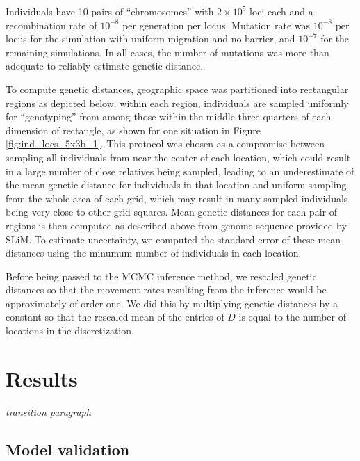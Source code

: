 \documentclass{article}
\newcommand{\plr}[1]{{\em \color{blue} #1}}
\begin{document}
Individuals have 10 pairs of ``chromosomes'' with $2 \times 10^5$ loci each 
and a recombination rate of $10^{-8}$ per generation per locus.
Mutation rate was $10^{-8}$ per locus for the simulation with uniform migration and no barrier,
and $10^{-7}$ for the remaining simulations.
In all cases, the number of mutations was more than adequate to reliably estimate genetic distance.

To compute genetic distances,
geographic space was partitioned into rectangular regions as depicted below.
within each region, 
individuals are sampled uniformly for ``genotyping'' 
from among those within the middle three quarters of each dimension of rectangle,
as shown for one situation in Figure \ref{fig:ind_locs_5x3b_1}.
This protocol was chosen as a compromise between sampling all individuals 
from near the center of each location,
which could result in a large number of close relatives being sampled, 
leading to an underestimate of the mean genetic distance for individuals in that location
and uniform sampling from the whole area of each grid, 
which may result in many sampled individuals being very close to other grid squares.
Mean genetic distances for each pair of regions is then computed as described above
from genome sequence provided by SLiM.
To estimate uncertainty, we computed the standard error of these mean distances
using the minumum number of individuals in each location.

Before being passed to the MCMC inference method,
we rescaled genetic distances so that the movement rates resulting from the inference
would be approximately of order one.
We did this by multiplying genetic distances by a constant
so that the rescaled mean of the entries of $D$
is equal to the number of locations in the discretization. 



\section*{Results}

\plr{transition paragraph}


\subsection*{Model validation}
\end{document}
